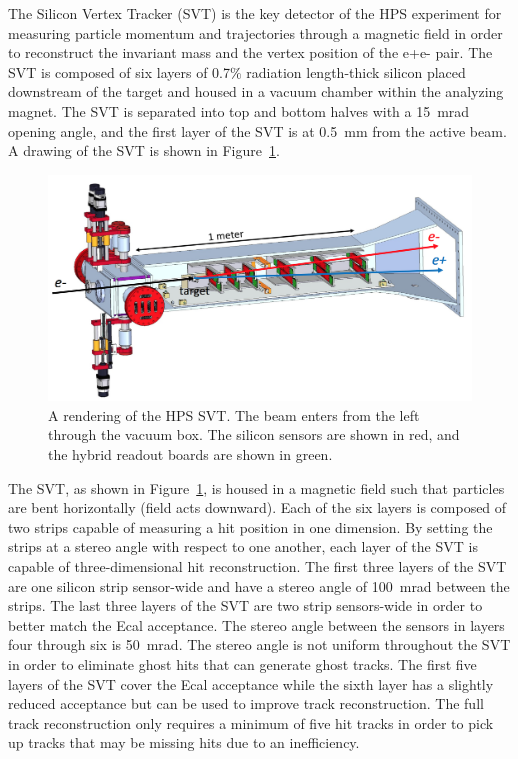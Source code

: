 The Silicon Vertex Tracker (SVT) is the key detector of the HPS experiment for measuring particle momentum and trajectories through a magnetic field in order to reconstruct the invariant mass and the vertex position of the e+e- pair. The SVT is composed of six layers of 0.7$\%$ radiation length-thick silicon placed downstream of the target and housed in a vacuum chamber within the analyzing magnet. The SVT is separated into top and bottom halves with a 15~mrad opening angle, and the first layer of the SVT is at 0.5~mm from the active beam. A drawing of the SVT is shown in Figure~\ref{Figure:svt}.

\begin{figure}[H]
  \centering
      \includegraphics[width=1.0\textwidth]{pics/experiment/svt.png}
  \caption[Rendering of the HPS SVT]{A rendering of the HPS SVT. The beam enters from the left through the vacuum box. The silicon sensors are shown in red, and the hybrid readout boards are shown in green.}
  \label{Figure:svt}
\end{figure}


The SVT, as shown in Figure~\ref{Figure:svt}, is housed in a magnetic field such that particles are bent horizontally (field acts downward). Each of the six layers is composed of two strips capable of measuring a hit position in one dimension. By setting the strips at a stereo angle with respect to one another, each layer of the SVT is capable of three-dimensional hit reconstruction. The first three layers of the SVT are one silicon strip sensor-wide and have a stereo angle of 100~mrad between the strips. The last three layers of the SVT are two strip sensors-wide in order to better match the Ecal acceptance. The stereo angle between the sensors in layers four through six is 50~mrad. The stereo angle is not uniform throughout the SVT in order to eliminate ghost hits that can generate ghost tracks. The first five layers of the SVT cover the Ecal acceptance while the sixth layer has a slightly reduced acceptance but can be used to improve track reconstruction. The full track reconstruction only requires a minimum of five hit tracks in order to pick up tracks that may be missing hits due to an inefficiency. 

